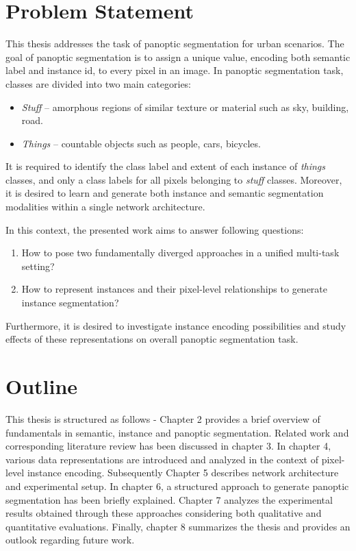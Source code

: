 \section{Problem Statement}

This thesis addresses the task of panoptic segmentation for urban scenarios. The goal
of panoptic segmentation is to assign a unique value, encoding both semantic label and instance id, to every pixel in an image. In panoptic segmentation task, classes are divided into two main categories:

\begin{itemize}
  \item \textit{Stuff}  – amorphous regions of similar texture or material such as sky, building, road.
  \item \textit{Things} – countable objects such as people, cars, bicycles.
\end{itemize}

It is required to identify the class label and extent of each instance of  \textit{things} classes, and only a class labels for all pixels belonging to \textit{stuff} classes. Moreover, it is desired to learn and generate both instance and semantic segmentation modalities within a single network architecture.

In this context, the presented work aims to answer following questions:

\begin{enumerate}

	\item  How to pose two fundamentally diverged approaches in a unified multi-task setting?
	\item  How to represent instances and their pixel-level relationships to generate instance segmentation?

\end{enumerate}

Furthermore, it is desired to investigate instance encoding possibilities and study effects of these representations on overall panoptic segmentation task. 


\section{Outline}
This thesis is structured as follows - Chapter 2 provides a brief overview of fundamentals in semantic, instance and panoptic segmentation. Related work and corresponding literature review has been discussed in chapter 3. In chapter 4, various data representations are introduced and analyzed in the context of pixel-level instance encoding. Subsequently Chapter 5 describes network architecture and experimental setup. In chapter 6, a structured approach to generate panoptic segmentation has been briefly explained. Chapter 7 analyzes the experimental results obtained through these approaches considering both qualitative and quantitative evaluations. Finally, chapter 8 summarizes the thesis and provides an outlook regarding future work.
